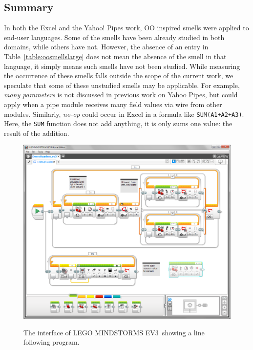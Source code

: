 \documentclass{sig-alternate}
\newcommand{\todo}[1]{\textbf{TODO: #1}}
\newcommand{\ms}{LEGO MINDSTORMS EV3}
\begin{document}
\subsection{Summary}
In both the Excel and the Yahoo! Pipes work, OO inspired smells were applied to end-user languages. Some of the smells have been already studied in both domains, while others have not. However, the absence of an entry in Table~\ref{table:oosmellslarge} does not mean the absence of the smell in that language, it simply means such smells have not been studied. While measuring the occurrence of these smells falls outside the scope of the current work, we speculate
that some of these unstudied smells may be applicable. 
For example, \emph{many parameters} is not discussed in previous work on Yahoo Pipes, but could apply when a pipe module receives many field values via wire from other modules. 
Similarly, \emph{no-op} could occur in Excel in a formula like {\tt SUM(A1+A2+A3)}. Here, the {\tt SUM} function does not add anything, it is only sums one value: the result of the addition. 


\begin{figure} [ht]
\caption{The interface of \ms~showing a line following program.}
\centering
\includegraphics[width=\columnwidth]{img/ms}
\label{fig:ms}
\end{figure}


\end{document}
